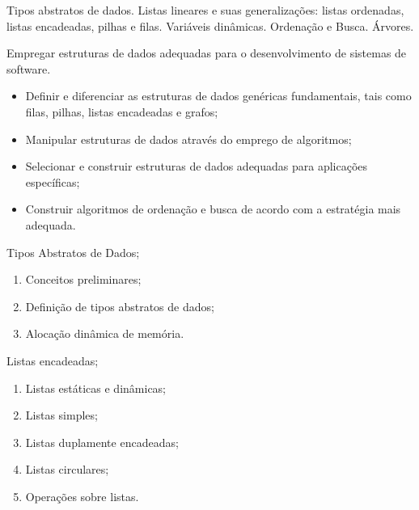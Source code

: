 \begin{pud}
	
	
	\ementa
	Tipos abstratos de dados. Listas lineares e suas generalizações: listas ordenadas, listas encadeadas, pilhas e filas. Variáveis dinâmicas. Ordenação e Busca. Árvores.
	
	\objetivos
	Empregar estruturas de dados adequadas para o desenvolvimento de sistemas de software.
	\begin{itemize}
	  \item Definir e diferenciar as estruturas de dados genéricas fundamentais, tais como filas, pilhas, listas encadeadas e grafos;
	  \item Manipular estruturas de dados através do emprego de algoritmos;
	  \item Selecionar e construir estruturas de dados adequadas para aplicações específicas;
	  \item Construir algoritmos de ordenação e busca de acordo com a estratégia mais adequada.
	\end{itemize}
	
	
	\programa
	
	\begin{description}[itemsep=0em]
		\item[UNIDADE I:] Tipos Abstratos de Dados; 
         \begin{enumerate}[itemsep=0em, topsep=0em]
           \item Conceitos preliminares;
           \item Definição de tipos abstratos de dados;
           \item Alocação dinâmica de memória.
         \end{enumerate}
         
         \item[UNIDADE II:] Listas encadeadas; 
         \begin{enumerate}[itemsep=0em, topsep=0em]
           \item Listas estáticas e dinâmicas;
           \item Listas simples;
           \item Listas duplamente encadeadas; 
           \item Listas circulares;
           \item Operações sobre listas.
         \end{enumerate}
         

\end{description}
\end{pud}
